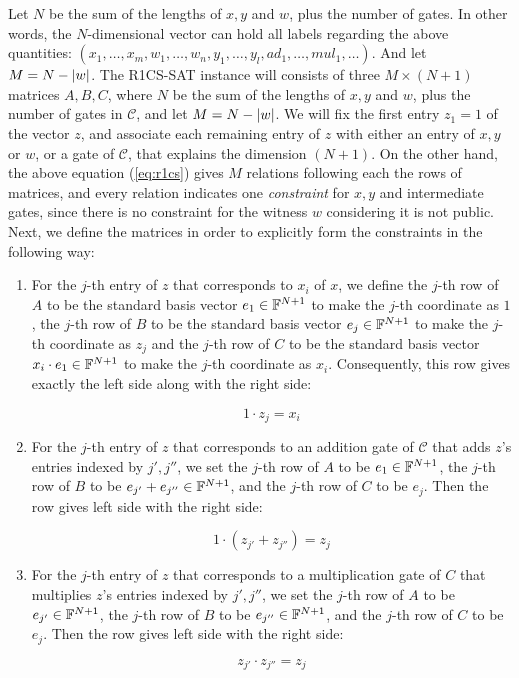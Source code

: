 \documentclass{article}
\begin{document}
Let $N$ be the sum of the lengths of $x, y$ and $w$, plus the number of gates. In other words, the $N$-dimensional vector can hold all labels regarding the above quantities: $(x_1, \dots, x_m, w_1, \dots, w_n, y_1, \dots, y_l, ad_1, \dots, mul_1, \dots)$. And let $M = N - \abs{w}$. The R1CS-SAT instance will consists of three $M \times (N+1)$ matrices $A, B, C$, where $N$ be the sum of the lengths of $x, y$ and $w$, plus the number of gates in $\mathcal{C}$, and let $M = N - \abs{w}$. We will fix the first entry $z_1 = 1$ of the vector $z$, and associate each remaining entry of $z$ with either an entry of $x, y$ or $w$, or a gate of $\mathcal{C}$, that explains the dimension $(N + 1)$. On the other hand, the above equation (\ref{eq:r1cs}) gives $M$ relations following each the rows of matrices, and every relation indicates one \textit{constraint} for $x, y$ and intermediate gates, since there is no constraint for the witness $w$ considering it is not public. Next, we define the matrices in order to explicitly form the constraints in the following way:

\begin{enumerate}
\item\label{item:55} For the $j$-th entry of $z$ that corresponds to $x_i$ of $x$, we define the $j$-th row of $A$ to be the standard basis vector $e_1 \in \mathbb{F}^{N+1}$ to make the $j$-th coordinate as $1$, the $j$-th row of $B$ to be the standard basis vector $e_j \in \mathbb{F}^{N+1}$ to make the $j$-th coordinate as $z_{j}$ and the $j$-th row of $C$ to be the standard basis vector $x_i \cdot e_{1} \in \mathbb{F}^{N+1}$ to make the $j$-th coordinate as $x_{i}$. Consequently, this row gives exactly the left side along with the right side:

\begin{equation*}
1 \cdot z_{j} = x_{i} 
\end{equation*} 
\item\label{item:56} For the $j$-th entry of $z$ that corresponds to an addition gate of $\mathcal{C}$ that adds $z$'s entries indexed by $j', j''$, we set the $j$-th row of $A$ to be $e_1 \in \mathbb{F}^{N+1}$, the $j$-th row of $B$ to be $e_{j'} + e_{j''} \in \mathbb{F}^{N+1}$, and the $j$-th row of $C$ to be $e_{j}$. Then the row gives left side with the right side:

\begin{equation*}
1 \cdot (z_{j'} + z_{j''}) = z_j
\end{equation*}
\item\label{item:57} For the $j$-th entry of $z$ that corresponds to a multiplication gate of $C$ that multiplies $z$'s entries indexed by $j', j''$, we set the $j$-th row of $A$ to be $e_{j'} \in \mathbb{F}^{N+1}$, the $j$-th row of $B$ to be $e_{j''} \in \mathbb{F}^{N+1}$, and the $j$-th row of $C$ to be $e_{j}$. Then the row gives left side with the right side:

\begin{equation*}
z_{j'} \cdot z_{j''} = z_j
\end{equation*}
\end{enumerate}
\end{document}
